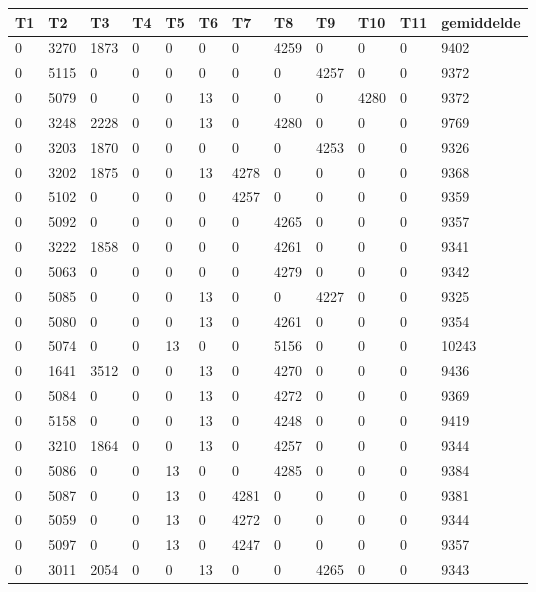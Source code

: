 \begin{longtable}{ | l | l | l | l | l | l | l | l | l | l | l || l |  }

	\hline

	T1 & T2 & T3 & T4 & T5 & T6 & T7 & T8 & T9 & T10 & T11 & gemiddelde \\ \hline
	0 & 3270 & 1873 & 0 & 0 & 0 & 0 & 4259 & 0 & 0 & 0 & 9402 \\ \hline
	0 & 5115 & 0 & 0 & 0 & 0 & 0 & 0 & 4257 & 0 & 0 & 9372 \\ \hline
	0 & 5079 & 0 & 0 & 0 & 13 & 0 & 0 & 0 & 4280 & 0 & 9372 \\ \hline
	0 & 3248 & 2228 & 0 & 0 & 13 & 0 & 4280 & 0 & 0 & 0 & 9769 \\ \hline
	0 & 3203 & 1870 & 0 & 0 & 0 & 0 & 0 & 4253 & 0 & 0 & 9326 \\ \hline
	0 & 3202 & 1875 & 0 & 0 & 13 & 4278 & 0 & 0 & 0 & 0 & 9368 \\ \hline
	0 & 5102 & 0 & 0 & 0 & 0 & 4257 & 0 & 0 & 0 & 0 & 9359 \\ \hline
	0 & 5092 & 0 & 0 & 0 & 0 & 0 & 4265 & 0 & 0 & 0 & 9357 \\ \hline
	0 & 3222 & 1858 & 0 & 0 & 0 & 0 & 4261 & 0 & 0 & 0 & 9341 \\ \hline
	0 & 5063 & 0 & 0 & 0 & 0 & 0 & 4279 & 0 & 0 & 0 & 9342 \\ \hline
	0 & 5085 & 0 & 0 & 0 & 13 & 0 & 0 & 4227 & 0 & 0 & 9325 \\ \hline
	0 & 5080 & 0 & 0 & 0 & 13 & 0 & 4261 & 0 & 0 & 0 & 9354 \\ \hline
	0 & 5074 & 0 & 0 & 13 & 0 & 0 & 5156 & 0 & 0 & 0 & 10243 \\ \hline
	0 & 1641 & 3512 & 0 & 0 & 13 & 0 & 4270 & 0 & 0 & 0 & 9436 \\ \hline
	0 & 5084 & 0 & 0 & 0 & 13 & 0 & 4272 & 0 & 0 & 0 & 9369 \\ \hline
	0 & 5158 & 0 & 0 & 0 & 13 & 0 & 4248 & 0 & 0 & 0 & 9419 \\ \hline
	0 & 3210 & 1864 & 0 & 0 & 13 & 0 & 4257 & 0 & 0 & 0 & 9344 \\ \hline
	0 & 5086 & 0 & 0 & 13 & 0 & 0 & 4285 & 0 & 0 & 0 & 9384 \\ \hline
	0 & 5087 & 0 & 0 & 13 & 0 & 4281 & 0 & 0 & 0 & 0 & 9381 \\ \hline
	0 & 5059 & 0 & 0 & 13 & 0 & 4272 & 0 & 0 & 0 & 0 & 9344 \\ \hline
	0 & 5097 & 0 & 0 & 13 & 0 & 4247 & 0 & 0 & 0 & 0 & 9357 \\ \hline
	0 & 3011 & 2054 & 0 & 0 & 13 & 0 & 0 & 4265 & 0 & 0 & 9343 \\ \hline

\end{longtable}
